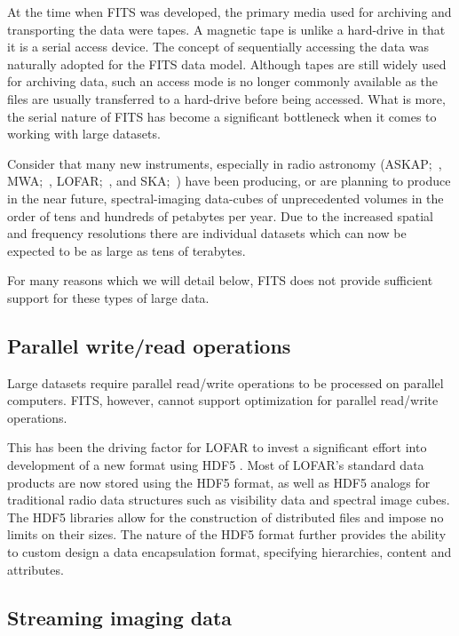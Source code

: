 \documentclass[final,authoryear,5p,times,twocolumn]{elsarticle}
\begin{document}
{{At the time when FITS was developed, the primary media used for
archiving and transporting the data were tapes. A magnetic tape is
unlike a hard-drive in that it is a serial access device.  The concept
of sequentially accessing the data was naturally adopted for the FITS data
model.  Although tapes are still widely used for archiving data,
such an access mode is no longer commonly available as the files are usually
transferred to a hard-drive before being accessed. What is more, the
serial nature of FITS has become a significant bottleneck when it comes
to working with large datasets.


Consider that many new instruments, especially in radio astronomy
(ASKAP;~\citealp{2009IEEEP..97.1507D},
MWA;~\citealp{2013PASA...30....7T}, LOFAR;~\citealp{2013A&A...556A...2V}, and
SKA;~\citealp{ska-exascale})
have been producing, or are planning to produce in the near future,
spectral-imaging data-cubes of unprecedented volumes in the order of
tens and hundreds of petabytes per year. Due to the increased spatial and frequency
resolutions there are individual datasets which can now be expected to be as
large as tens of terabytes.

For many reasons which we will detail below, FITS does not provide sufficient
support for these types of large data.

\subsection{Parallel write/read operations}
\label{subsection_parallel_io}

Large datasets require parallel read/write operations to be processed on
parallel computers.  FITS, however, cannot support optimization for parallel 
read/write operations.

This has been the driving factor for LOFAR to
invest a significant effort into development of a new format using
HDF5  \citep{2012ASPC..461..283A}. Most of LOFAR's standard data products
are now stored using the HDF5 format, as well as HDF5 analogs for traditional radio data
structures such as visibility data and spectral image cubes.  The HDF5 libraries allow 
for the construction of distributed files and impose no limits on their sizes.
The nature of the HDF5
format further provides the ability to custom design a data encapsulation format,
specifying hierarchies, content and attributes.

\subsection{Streaming imaging data}
\label{subsection_stream_image}

}}
\end{document}
